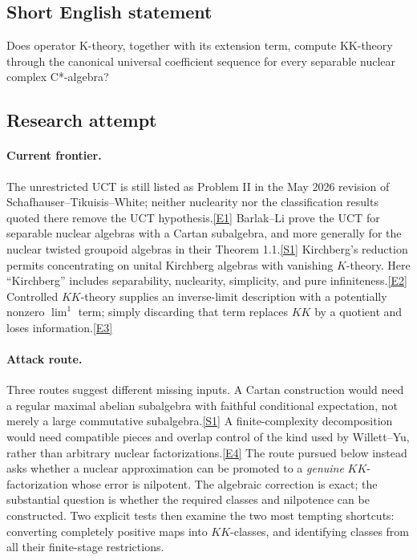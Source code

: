 \documentclass[11pt,a4paper]{article}
\newcommand{\sref}[2]{\hyperlink{source:#1:#2}{[S#2]}}
\newcommand{\eref}[2]{\hyperlink{extra:#1:#2}{[E#2]}}
\begin{document}
\subsection{Short English statement}
Does operator K-theory, together with its extension term, compute KK-theory through the canonical universal coefficient sequence for every separable nuclear complex C*-algebra?
\subsection{Research attempt}

\paragraph{Current frontier.}
The unrestricted UCT is still listed as Problem II in the May 2026 revision
of Schafhauser--Tikuisis--White; neither nuclearity nor the classification
results quoted there remove the UCT hypothesis.\eref{203}{1}
Barlak--Li prove the UCT for separable nuclear algebras with a Cartan
subalgebra, and more generally for the nuclear twisted groupoid algebras
in their Theorem 1.1.\sref{203}{1}
Kirchberg's reduction permits concentrating on unital Kirchberg algebras
with vanishing $K$-theory. Here ``Kirchberg'' includes separability,
nuclearity, simplicity, and pure infiniteness.\eref{203}{2}
Controlled $KK$-theory supplies an inverse-limit description with a
potentially nonzero $\lim^1$ term; simply discarding that term replaces
$KK$ by a quotient and loses information.\eref{203}{3}

\paragraph{Attack route.}
Three routes suggest different missing inputs. A Cartan construction would
need a regular maximal abelian subalgebra with faithful conditional
expectation, not merely a large commutative subalgebra.\sref{203}{1}
A finite-complexity decomposition would need compatible pieces and overlap
control of the kind used by Willett--Yu, rather than arbitrary nuclear
factorizations.\eref{203}{4}
The route pursued below instead asks whether a nuclear approximation can
be promoted to a \emph{genuine} $KK$-factorization whose error is nilpotent.
The algebraic correction is exact; the substantial question is whether the
required classes and nilpotence can be constructed. Two explicit tests
then examine the two most tempting shortcuts: converting completely
positive maps into $KK$-classes, and identifying classes from all their
finite-stage restrictions.
\end{document}
